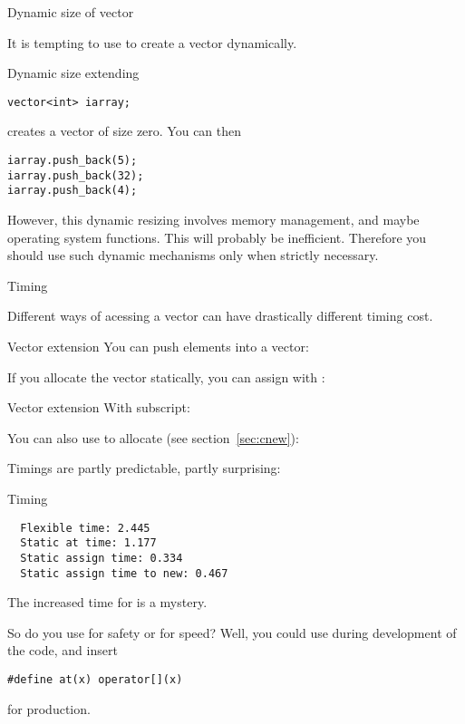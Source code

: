  {Dynamic size of vector}

It is tempting to use  to create a vector dynamically.

\begin{block}{Dynamic size extending}
  \label{sl:vector-extend}
\begin{verbatim}
vector<int> iarray;
\end{verbatim}
creates a vector of size zero. You can then
\begin{verbatim}
iarray.push_back(5);
iarray.push_back(32);
iarray.push_back(4);
\end{verbatim}
\end{block}

However, this dynamic resizing involves memory management, and maybe
operating system functions. This will probably be
inefficient. Therefore you should use such dynamic mechanisms only
when strictly necessary.

 {Timing}

Different ways of acessing a vector can have drastically different
timing cost.

\begin{block}{Vector extension}
  \label{sl:vect-extend-code}
  You can push elements into a vector:

  If you allocate the vector statically, you can assign with :
\end{block}

\begin{block}{Vector extension}
  \label{sl:vect-extend-code2}
  With subscript:

  You can also use  to allocate (see section~\ref{sec:cnew}):
\end{block}

Timings are partly predictable, partly surprising:
\begin{block}{Timing}
  \label{sl:vector-extend-time}
\begin{verbatim}
  Flexible time: 2.445
  Static at time: 1.177
  Static assign time: 0.334
  Static assign time to new: 0.467
\end{verbatim}
\end{block}

The increased time for  is a mystery.

So do you use  for safety or \n{[]} for speed? Well, you could
use  during development of the code, and insert
\begin{verbatim}
#define at(x) operator[](x)
\end{verbatim}
for production.


